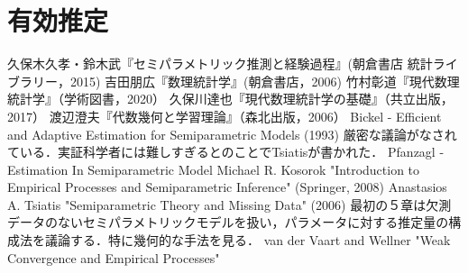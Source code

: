 \documentclass[uplatex,dvipdfmx]{jsreport}
\begin{document}
\chapter{有効推定}

\begin{thebibliography}{99}
    久保木久孝・鈴木武『セミパラメトリック推測と経験過程』(朝倉書店 統計ライブラリー，2015)
    吉田朋広『数理統計学』(朝倉書店，2006)
    竹村彰道『現代数理統計学』（学術図書，2020）
    久保川達也『現代数理統計学の基礎』（共立出版，2017）
    渡辺澄夫『代数幾何と学習理論』（森北出版，2006）
    Bickel - Efficient and Adaptive Estimation for Semiparametric Models (1993)
    厳密な議論がなされている．実証科学者には難しすぎるとのことでTsiatisが書かれた．
    Pfanzagl - Estimation In Semiparametric Model
    Michael R. Kosorok "Introduction to Empirical Processes and Semiparametric Inference" (Springer, 2008)
    Anastasios A. Tsiatis "Semiparametric Theory and Missing Data" (2006)
    最初の５章は欠測データのないセミパラメトリックモデルを扱い，パラメータに対する推定量の構成法を議論する．特に幾何的な手法を見る．
    van der Vaart and Wellner "Weak Convergence and Empirical Processes"
\end{thebibliography}
\end{document}

